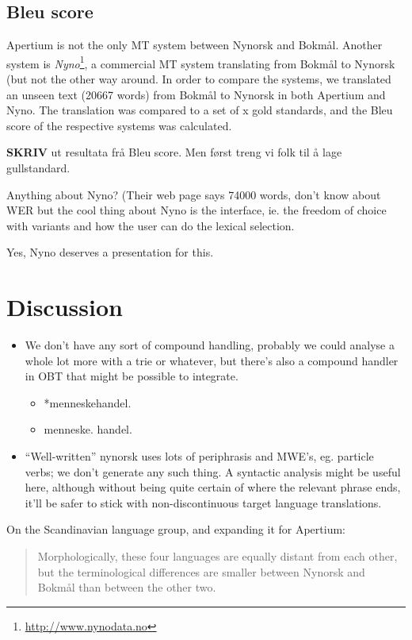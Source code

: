 \documentclass[11pt]{article}
\begin{document}
\subsection{Bleu score}

Apertium is not the only MT system between Nynorsk and Bokmål. Another
system is
\textit{Nyno}\footnote{\href{http://www.nynodata.no}{http://www.nynodata.no}},
a commercial MT system translating from Bokmål to Nynorsk (but not the
other way around. In order to compare the systems, we translated an
unseen text (20667 words) from Bokmål to Nynorsk in both Apertium and
Nyno. The translation was compared to a set of x gold standards, and
the Bleu score of the respective systems was calculated.

\textbf{SKRIV} ut resultata frå Bleu score. Men først treng vi folk til å lage gullstandard.

Anything about Nyno? (Their web page says 74000 words, don't know
  about WER but the cool thing about Nyno is the interface, ie. the
  freedom of choice with variants and how the user can do the lexical
  selection.
  
  Yes, Nyno deserves a presentation for this.

\section{Discussion}

\begin{itemize}
\item We don't have any sort of compound handling, probably we could
  analyse a whole lot more with a trie or whatever, but there's also a
  compound handler in OBT that might be possible to integrate.

\begin{itemize}
\item *menneskehandel.
\item menneske. handel.
\end{itemize}

\item ``Well-written'' nynorsk uses lots of periphrasis and MWE's, eg. particle
  verbs; we don't generate any such thing. A syntactic analysis might
  be useful here, although without being quite certain of where the
  relevant phrase ends, it'll be safer to stick with non-discontinuous
  target language translations.
\end{itemize}
On the Scandinavian language group, and expanding it for Apertium:
\begin{quote}
Morphologically, these four languages are equally distant from each
other, but the terminological differences are smaller between Nynorsk
and Bokmål than between the other two. \\
\citep{everson2000sln}
\end{quote}
\end{document}
